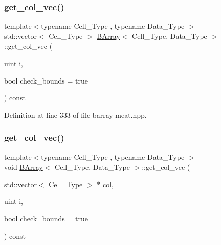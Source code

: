 \subsubsection{\texorpdfstring{get\+\_\+col\+\_\+vec()}{get\_col\_vec()}\hspace{0.1cm}{\footnotesize\ttfamily [1/2]}}
{\footnotesize\ttfamily template$<$typename Cell\+\_\+\+Type , typename Data\+\_\+\+Type $>$ \\
std\+::vector$<$ Cell\+\_\+\+Type $>$ \hyperlink{class_b_array}{B\+Array}$<$ Cell\+\_\+\+Type, Data\+\_\+\+Type $>$\+::get\+\_\+col\+\_\+vec (\begin{DoxyParamCaption}\item[{\hyperlink{typedefs_8hpp_a91ad9478d81a7aaf2593e8d9c3d06a14}{uint}}]{i,  }\item[{bool}]{check\+\_\+bounds = {\ttfamily true} }\end{DoxyParamCaption}) const\hspace{0.3cm}{\ttfamily [inline]}}



Definition at line 333 of file barray-\/meat.\+hpp.

\mbox{\label{class_b_array_a655e21d184c3cb0ce758168319dc7021}} 
\subsubsection{\texorpdfstring{get\+\_\+col\+\_\+vec()}{get\_col\_vec()}\hspace{0.1cm}{\footnotesize\ttfamily [2/2]}}
{\footnotesize\ttfamily template$<$typename Cell\+\_\+\+Type , typename Data\+\_\+\+Type $>$ \\
void \hyperlink{class_b_array}{B\+Array}$<$ Cell\+\_\+\+Type, Data\+\_\+\+Type $>$\+::get\+\_\+col\+\_\+vec (\begin{DoxyParamCaption}\item[{std\+::vector$<$ Cell\+\_\+\+Type $>$ $\ast$}]{col,  }\item[{\hyperlink{typedefs_8hpp_a91ad9478d81a7aaf2593e8d9c3d06a14}{uint}}]{i,  }\item[{bool}]{check\+\_\+bounds = {\ttfamily true} }\end{DoxyParamCaption}) const\hspace{0.3cm}{\ttfamily [inline]}}



